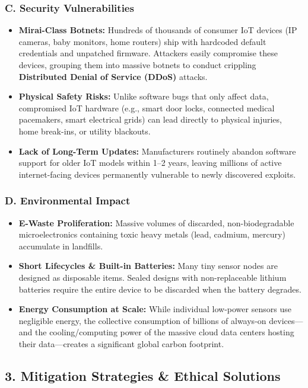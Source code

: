\subsubsection{C. Security Vulnerabilities}
\begin{itemize}
  \item   \textbf{Mirai-Class Botnets:} Hundreds of thousands of consumer IoT devices (IP cameras, baby monitors, home routers) ship with hardcoded default credentials and unpatched firmware. Attackers easily compromise these devices, grouping them into massive botnets to conduct crippling \textbf{Distributed Denial of Service (DDoS)} attacks.
  \item   \textbf{Physical Safety Risks:} Unlike software bugs that only affect data, compromised IoT hardware (e.g., smart door locks, connected medical pacemakers, smart electrical grids) can lead directly to physical injuries, home break-ins, or utility blackouts.
  \item   \textbf{Lack of Long-Term Updates:} Manufacturers routinely abandon software support for older IoT models within 1–2 years, leaving millions of active internet-facing devices permanently vulnerable to newly discovered exploits.
\end{itemize}

\subsubsection{D. Environmental Impact}
\begin{itemize}
  \item   \textbf{E-Waste Proliferation:} Massive volumes of discarded, non-biodegradable microelectronics containing toxic heavy metals (lead, cadmium, mercury) accumulate in landfills.
  \item   \textbf{Short Lifecycles \& Built-in Batteries:} Many tiny sensor nodes are designed as disposable items. Sealed designs with non-replaceable lithium batteries require the entire device to be discarded when the battery degrades.
  \item   \textbf{Energy Consumption at Scale:} While individual low-power sensors use negligible energy, the collective consumption of billions of always-on devices—and the cooling/computing power of the massive cloud data centers hosting their data—creates a significant global carbon footprint.
\end{itemize}


\subsection{3. Mitigation Strategies \& Ethical Solutions}

